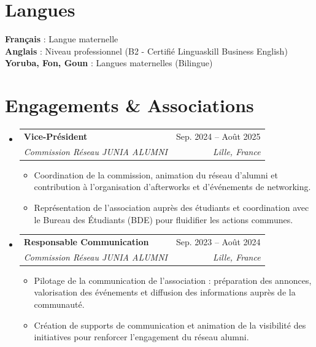 \documentclass[letterpaper,11pt]{article}
\makeatletter
\newcommand{\resumeItem}[1]{
  \item\small{{#1 \vspace{-1.5pt}}}
}
\newcommand{\resumeSubheading}[4]{
  \vspace{1pt}\item
    \begin{tabular*}{0.97\textwidth}[t]{l@{\extracolsep{\fill}}r}
      {\color{primary}\textbf{#1}} & #2 \\
      \textit{\small#3} & \textit{\small #4} \\
    \end{tabular*}\vspace{-4pt}
}
\newcommand{\resumeSubHeadingListStart}{\begin{itemize}[leftmargin=0.15in, label={}]}
\newcommand{\resumeSubHeadingListEnd}{\end{itemize}}
\newcommand{\resumeItemListStart}{\begin{itemize}[leftmargin=0.15in, label={\small\textbullet}, itemsep=1.5pt, parsep=0pt, topsep=2pt, partopsep=0pt]}
\newcommand{\resumeItemListEnd}{\end{itemize}\vspace{-1pt}}
\makeatother
\begin{document}
\section{Langues}
\begin{itemize}[leftmargin=0.15in, label={}]
  \small{\item{
   \textbf{Français} : Langue maternelle \vspace{1.5pt} \\
   \textbf{Anglais} : Niveau professionnel (B2 - Certifié Linguaskill Business English) \vspace{1.5pt} \\
   \textbf{Yoruba, Fon, Goun} : Langues maternelles (Bilingue)
  }}
\end{itemize}

\section{Engagements \& Associations}
\resumeSubHeadingListStart
  \resumeSubheading
    {Vice-Président}{Sep. 2024 -- Août 2025}
    {Commission Réseau JUNIA ALUMNI}{Lille, France}
    \resumeItemListStart
      \resumeItem{Coordination de la commission, animation du réseau d'alumni et contribution à l'organisation d'afterworks et d'événements de networking.}
      \resumeItem{Représentation de l'association auprès des étudiants et coordination avec le Bureau des Étudiants (BDE) pour fluidifier les actions communes.}
    \resumeItemListEnd

  \resumeSubheading
    {Responsable Communication}{Sep. 2023 -- Août 2024}
    {Commission Réseau JUNIA ALUMNI}{Lille, France}
    \resumeItemListStart
      \resumeItem{Pilotage de la communication de l'association : préparation des annonces, valorisation des événements et diffusion des informations auprès de la communauté.}
      \resumeItem{Création de supports de communication et animation de la visibilité des initiatives pour renforcer l'engagement du réseau alumni.}
    \resumeItemListEnd
\resumeSubHeadingListEnd
\end{document}
